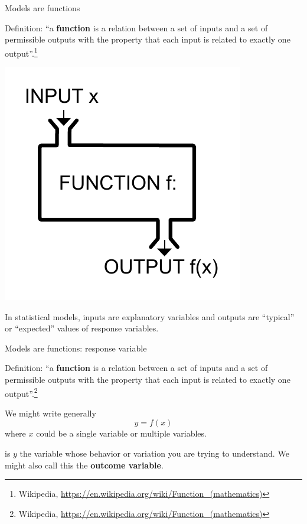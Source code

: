 \documentclass[table]{beamer}\usepackage[]{graphicx}\usepackage[]{color}
\begin{document}

\begin{frame}[fragile]{Models are functions}

Definition: ``a {\bf function} is a relation between a set of inputs and a set of permissible outputs with the property that each input is related to exactly one output''.\footnote{Wikipedia, \href{https://en.wikipedia.org/wiki/Function_(mathematics)}{https://en.wikipedia.org/wiki/Function\_(mathematics)}}

\includegraphics[width=.5\textwidth]{figure-static/Function_machine2}  

In statistical models, inputs are explanatory variables and outputs are ``typical'' or ``expected'' values of response variables. %



\end{frame}



\begin{frame}[fragile]{Models are functions: response variable}

Definition: ``a {\bf function} is a relation between a set of inputs and a set of permissible outputs with the property that each input is related to exactly one output''.\footnote{Wikipedia, \href{https://en.wikipedia.org/wiki/Function_(mathematics)}{https://en.wikipedia.org/wiki/Function\_(mathematics)}}

\vspace{2em}



We might write generally $$ y = f(x)$$ where $x$ could be a single variable or multiple variables.

\vspace{1em}

\bi
   is $y$ the variable whose behavior or variation you are trying to understand. We might also call this the {\bf outcome variable}.
\ei

\end{frame}
\end{document}
